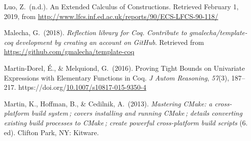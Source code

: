 \documentclass[12pt,twoside]{article}
\begin{document}
{\begin{thebibliography}{222}
\mdbibitemlabel{[Luo, n.d.]}Luo, Z.~(n.d.). An Extended Calculus of Constructions. Retrieved February 1, 2019, from \href{http://www.lfcs.inf.ed.ac.uk/reports/90/ECS-LFCS-90-118/}{{\ttfamily http://\hspace{0pt}www.\hspace{0pt}lfcs.\hspace{0pt}inf.\hspace{0pt}ed.\hspace{0pt}ac.\hspace{0pt}uk/\hspace{0pt}reports/\hspace{0pt}90/\hspace{0pt}ECS-\hspace{0pt}LFCS-\hspace{0pt}90-\hspace{0pt}118/\hspace{0pt}}}\label{luo_extended_nodate}%

\mdbibitemlabel{[Malecha, 2018]}Malecha, G.~(2018). \emph{Reflection library for Coq. Contribute to gmalecha/template-coq development by creating an account on GitHub}. Retrieved from \href{https://github.com/gmalecha/template-coq}{{\ttfamily https://\hspace{0pt}github.\hspace{0pt}com/\hspace{0pt}gmalecha/\hspace{0pt}template-\hspace{0pt}coq}}\label{malecha_reflection_2018}%

Martin-Dorel, É., \& Melquiond, G.~(2016). Proving Tight Bounds on Univariate Expressions with Elementary Functions in Coq. \emph{J Autom Reasoning}, \emph{57}(3), 187–217. https://doi.org/\href{https://dx.doi.org/10.1007/s10817-015-9350-4}{10.1007/s10817-015-9350-4}\label{martin-dorel_proving_2016}%

Martin, K., Hoffman, B., \& Cedilnik, A.~(2013). \emph{Mastering CMake: a cross-platform build system ; covers installing and running CMake ; details converting existing build processes to CMake ; create powerful cross-platform build scripts} (6. ed). Clifton Park, NY: Kitware.\label{martin_mastering_2013}%


\end{thebibliography}}
\end{document}
